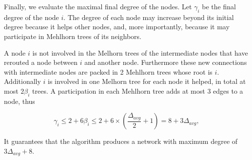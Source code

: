 \documentclass{article}
\begin{document}
Finally, we evaluate the maximal final degree of the nodes.
Let $\gamma_i$ be the final degree of the node $i$.
The degree of each node may increase beyond its initial degree because it helps other nodes, and, more importantly, because it may participate in Mehlhorn trees of its neighbors.

\medskip

A node $i$ is not involved in the Melhorn trees of the intermediate nodes
that have rerouted a node between $i$ and another node. Furthermore
these new connections with intermediate nodes are packed in 2 Mehlhorn trees
whose root is $i$. Additionally $i$ is involved in one Melhorn tree
for each node it helped, in total at most $2\beta_i$ trees.
A participation in each Mehlhorn tree adds at most $3$ edges to a node, thus

$$\gamma_i \leq 2 + 6\beta_i \leq 2 + 6 \times \left(\frac{\Delta_{avg}}{2}+1\right) = 8 + 3\Delta_{avg},$$

It guarantees that the algorithm produces a network
with maximum degree of $3\Delta_{avg} + 8$.
\end{document}

